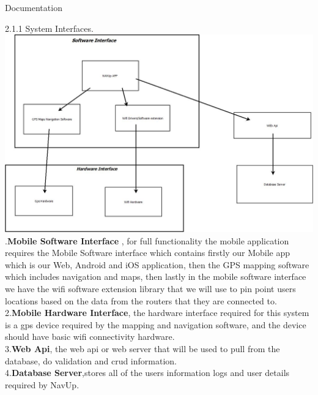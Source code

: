\documentclass[11pt]{article}
\begin{document}
Documentation

\begin{flushleft}
\item 2.1.1 System Interfaces.\newline
\includegraphics[scale=.5]{SystemInterfaces}
.\textbf {Mobile Software Interface} , for full functionality the mobile application requires the Mobile Software interface which contains firstly our Mobile app which is our Web, Android and iOS application, then the GPS mapping software which includes navigation and maps, then lastly in the mobile software interface we have the wifi software extension library that we will use to pin point users locations based on the data from the routers that they are connected to.
\\
2.\textbf{Mobile Hardware Interface}, the hardware interface required for this system is a gps device required by the mapping and navigation software, and the device should have basic wifi connectivity hardware.
\\
3.\textbf{Web Api}, the web api or web server that will be used to pull from the database, do validation and crud information.
 \\
4.\textbf{Database Server},stores all of the users information logs and user details required by NavUp.
\end{flushleft}
\end{document}
